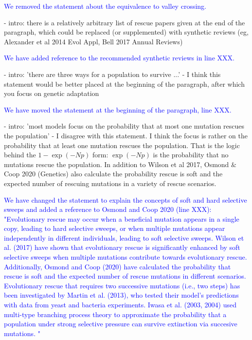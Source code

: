 \documentclass[12pt]{extarticle}
\begin{document}
\textcolor{blue}{
We removed the statement about the equivalence to valley crossing.
} 

- intro: there is a relatively arbitrary list of rescue papers given at the end of the paragraph, which could be replaced (or supplemented) with synthetic reviews (eg, Alexander et al 2014 Evol Appl, Bell 2017 Annual Reviews)

\textcolor{blue}{%
We have added reference to the recommended synthetic reviews in line XXX.
} 

- intro: 'there are three ways for a population to survive ...' - I think this statement would be better placed at the beginning of the paragraph, after which you focus on genetic adaptation

\textcolor{blue}{%
We have  moved the statement at the beginning of the paragraph, line XXX. 
} 

- intro: 'most models focus on the probability that at most one mutation rescues the population' - I disagree with this statement. I think the focus is rather on the probability that at least one mutation rescues the population. That is the logic behind the $1-\exp(-Np)$ form: $\exp(-Np)$ is the probability that no mutations rescue the population. In addition to Wilson et al 2017, Osmond $\&$ Coop 2020 (Genetics) also calculate the probability rescue is soft and the expected number of rescuing mutations in a variety of rescue scenarios.

\textcolor{blue}{%
We have changed the statement to explain the concepts of soft and hard selective sweeps and added a reference to Osmond and Coop 2020 (line XXX): "Evolutionary rescue may occur when a beneficial mutation appears in a single copy, leading to hard selective sweeps, or when multiple mutations appear independently in different individuals, leading to soft selective sweeps. Wilson et al. (2017) have shown that evolutionary rescue is significantly enhanced by soft selective sweeps when multiple mutations contribute towards evolutionary rescue. Additionally, Osmond and Coop (2020) have calculated the probability that rescue is soft and the expected number of rescue mutations in different scenarios. Evolutionary rescue that requires two successive mutations (i.e., two steps) has been investigated by Martin et al. (2013), who tested their model's predictions with data from yeast and bacteria experiments. Iwasa et al. (2003, 2004) used multi-type branching process theory to approximate the probability that a population under strong selective pressure can survive extinction via succesive mutations. " 
} 
\end{document}
